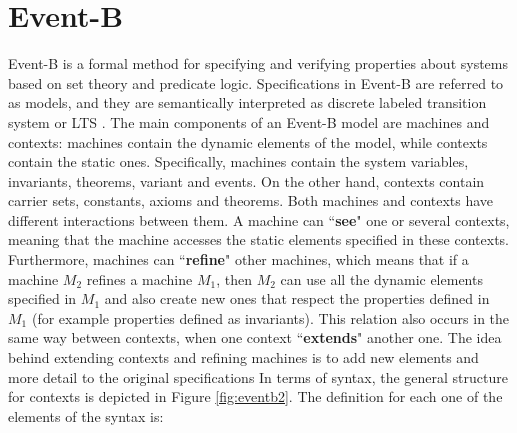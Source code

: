 \section{Event-B}
Event-B \cite{Abrial2011,Butler2013} is a formal method for specifying and verifying properties about systems based on set theory and predicate logic. Specifications in Event-B are referred to as models, and they are semantically interpreted as discrete labeled transition system or LTS \cite{LTS}. The main components of an Event-B model are machines and contexts: machines contain the dynamic elements of the model, while contexts contain the static ones. Specifically, machines contain the system variables, invariants, theorems, variant and events. On the other hand, contexts contain carrier sets, constants, axioms and theorems. Both machines and contexts have different interactions between them. A machine can ``\textbf{see}" one or several contexts, meaning that the machine accesses the static elements specified in these contexts. Furthermore, machines can ``\textbf{refine}" other machines, which means that if a machine $M_2$ refines a machine $M_1$, then $M_2$ can use all the dynamic elements specified in $M_1$ and also create new ones that respect the properties defined in $M_1$ (for example properties defined as invariants). This relation also occurs in the same way between contexts, when one context ``\textbf{extends}" another one. The idea behind extending contexts and refining machines is to add new elements and more detail to the original specifications %
In terms of syntax, the general structure for contexts is depicted in Figure \ref{fig:eventb2}. The definition for each one of the elements of the syntax is:
